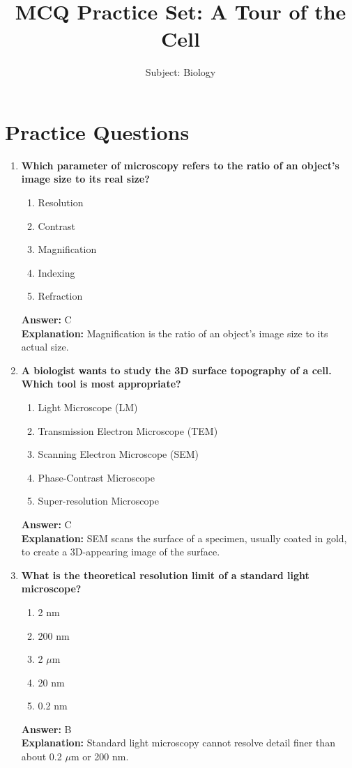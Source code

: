 \documentclass[11pt, a4paper]{article}
\title{MCQ Practice Set: A Tour of the Cell}
\author{Subject: Biology}
\date{}
\begin{document}
\maketitle

\section*{Practice Questions}

\begin{enumerate}[leftmargin=*, label=\arabic*.]

\item \textbf{Which parameter of microscopy refers to the ratio of an object's image size to its real size?}
\begin{enumerate}[label=\Alph*.]
\item Resolution
\item Contrast
\item Magnification
\item Indexing
\item Refraction
\end{enumerate}
\textbf{Answer:} C \\
\textbf{Explanation:} Magnification is the ratio of an object's image size to its actual size.

\item \textbf{A biologist wants to study the 3D surface topography of a cell. Which tool is most appropriate?}
\begin{enumerate}[label=\Alph*.]
\item Light Microscope (LM)
\item Transmission Electron Microscope (TEM)
\item Scanning Electron Microscope (SEM)
\item Phase-Contrast Microscope
\item Super-resolution Microscope
\end{enumerate}
\textbf{Answer:} C \\
\textbf{Explanation:} SEM scans the surface of a specimen, usually coated in gold, to create a 3D-appearing image of the surface.

\item \textbf{What is the theoretical resolution limit of a standard light microscope?}
\begin{enumerate}[label=\Alph*.]
\item 2 nm
\item 200 nm
\item 2 $\mu$m
\item 20 nm
\item 0.2 nm
\end{enumerate}
\textbf{Answer:} B \\
\textbf{Explanation:} Standard light microscopy cannot resolve detail finer than about 0.2 $\mu$m or 200 nm.


\end{enumerate}
\end{document}
